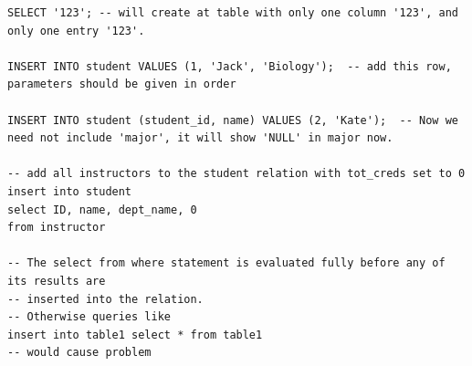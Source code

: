 \documentclass[8pt, a4paper, oneside, twocolumn]{extarticle}
\begin{document}
\begin{verbatim}
SELECT '123'; -- will create at table with only one column '123', and only one entry '123'.

INSERT INTO student VALUES (1, 'Jack', 'Biology');  -- add this row, parameters should be given in order

INSERT INTO student (student_id, name) VALUES (2, 'Kate');  -- Now we need not include 'major', it will show 'NULL' in major now.

-- add all instructors to the student relation with tot_creds set to 0
insert into student
select ID, name, dept_name, 0
from instructor

-- The select from where statement is evaluated fully before any of its results are
-- inserted into the relation.
-- Otherwise queries like
insert into table1 select * from table1
-- would cause problem
\end{verbatim}
\end{document}
